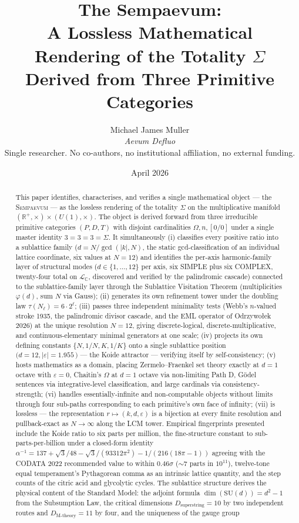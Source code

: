 \documentclass[11pt,a4paper]{article}
\title{\bfseries The Sempaevum:\\[2pt]
A Lossless Mathematical Rendering of the Totality $\Sigma$\\[2pt]
Derived from Three Primitive Categories}
\author{Michael James Muller\\
\small\textit{Aevum Defluo}\\[2pt]
\small Single researcher. No co-authors, no institutional affiliation, no external funding.}
\date{April 2026}
\theoremstyle{definition}
\theoremstyle{remark}
\newcommand{\R}{\mathbb{R}}
\newcommand{\C}{\mathbb{C}}
\newcommand{\Sempaevum}{\textnormal{\textsc{Sempaevum}}}
\begin{document}
\maketitle

\begin{abstract}
\noindent
This paper identifies, characterises, and verifies a single mathematical object — the \Sempaevum{} — as the lossless rendering of the totality $\Sigma$ on the multiplicative manifold $(\R^{+},\times) \times (U(1),\times)$. The object is derived forward from three irreducible primitive categories $(P,D,T)$ with disjoint cardinalities $\Omega, n, [0/0]$ under a single master identity $3=3=3=\Sigma$. It simultaneously (i) classifies every positive ratio into a sublattice family ($d = N/\gcd(|k|,N)$, the static gcd-classification of an individual lattice coordinate, six values at $N=12$) and identifies the per-axis harmonic-family layer of structural modes ($d \in \{1,\ldots,12\}$ per axis, six SIMPLE plus six COMPLEX, twenty-four total on $\mathcal{L}_{\C}$, discovered and verified by the palindromic cascade) connected to the sublattice-family layer through the Sublattice Visitation Theorem (multiplicities $\varphi(d)$, sum $N$ via Gauss); (ii) generates its own refinement tower under the doubling law $\tau(N_{\ell}) = 6 \cdot 2^{\ell}$; (iii) passes three independent minimality tests (Webb's $n$-valued stroke 1935, the palindromic divisor cascade, and the EML operator of Odrzywołek 2026) at the unique resolution $N=12$, giving discrete-logical, discrete-multiplicative, and continuous-elementary minimal generators at one scale; (iv) projects its own defining constants $\{N, 1/N, K, 1/K\}$ onto a single sublattice position $(d=12, |\varepsilon|=1.955$\,\textcent$)$ — the Koide attractor — verifying itself by self-consistency; (v) hosts mathematics as a domain, placing Zermelo--Fraenkel set theory exactly at $d=1$ octave with $\varepsilon=0$, Chaitin's $\Omega$ at $d=1$ octave via non-limiting Path D, Gödel sentences via integrative-level classification, and large cardinals via consistency-strength; (vi) handles essentially-infinite and non-computable objects without limits through four sub-paths corresponding to each primitive's own face of infinity; (vii) is lossless — the representation $r \mapsto (k,d,\varepsilon)$ is a bijection at every finite resolution and pullback-exact as $N \to \infty$ along the LCM tower. Empirical fingerprints presented include the Koide ratio to six parts per million, the fine-structure constant to sub-parts-per-billion under a closed-form identity $\alpha^{-1} = 137 + \sqrt{3}/48 - \sqrt{3}/(93312\pi^{2}) - 1/(216(18\pi-1))$ agreeing with the CODATA 2022 recommended value to within $0.46\sigma$ ($\sim 7$ parts in $10^{11}$), twelve-tone equal temperament's Pythagorean comma as an intrinsic lattice quantity, and the step counts of the citric acid and glycolytic cycles. The sublattice structure derives the physical content of the Standard Model: the adjoint formula $\dim(\mathrm{SU}(d)) = d^{2}-1$ from the Subsumption Law, the critical dimensions $D_{\mathrm{superstring}} = 10$ by two independent routes and $D_{\mathrm{M\text{-}theory}} = 11$ by four, and the uniqueness of the gauge group 
\end{abstract}
\end{document}
